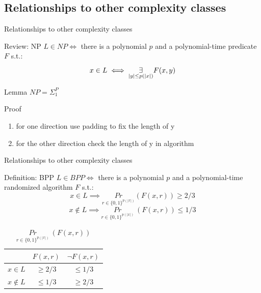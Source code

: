     \subsection{Relationships to other  complexity classes}
        \begin{frame}{Relationships to other complexity classes}  
            \begin{block}{Review: NP}
                $L \in NP \iff $ there is a polynomial $p$ and a polynomial-time predicate $F$ s.t.:
                $$x \in L \iff \overset{{}}{\underset{{|y| \leq p(|x|)}}{\Large \exists}} F(x,y)$$
            \end{block}
            \pause
            \begin{block}{Lemma}
                $NP = \Sigma_1^P$
            \end{block}
            \pause
            \begin{block}{Proof}
                \begin{enumerate}
                    \item  for one direction use padding to fix the length of y
                    \item for the other direction check the length of y in algorithm
                \end{enumerate}                
            \end{block}
        \end{frame}
        
        \begin{frame}{Relationships to other  complexity classes} 
            \begin{block}{Definition: BPP}
                $L \in BPP \iff $ there is a polynomial $p$ and a polynomial-time randomized algorithm $F$ s.t.:
                $$x \in L \implies \underset{r\in \{0,1\}^{p(|x|)}}{Pr}(F(x,r)) \geq 2/3$$
                $$x \notin L \implies \underset{r\in \{0,1\}^{p(|x|)}}{Pr}\ (F(x,r)) \leq 1/3$$
            \end{block}
            \begin{table}
                \centering
                \begin{tabular}{rcc}
                     & $F(x,r)$ & $\neg F(x,r)$ \\\hline
                    $x \in L$ & \(\geq 2/3\) & \(\leq 1/3\) \\
                    $x \notin L$ & \(\leq 1/3\) & \(\geq 2/3\) \\
                \end{tabular}
                \caption{$\underset{r\in \{0,1\}^{p(|x|)}}{Pr}\ (F(x,r))$}
                \label{BPP DEF}
            \end{table}
        \end{frame}

